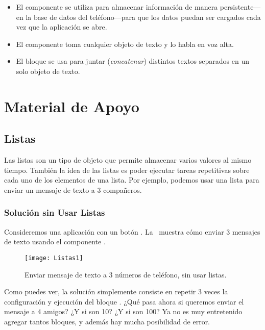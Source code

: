 {{\begin{itemize}
\item El componente  se utiliza para almacenar
  información de manera persistente---en la base de datos del
  teléfono---para que los datos puedan ser cargados cada vez que la
  aplicación se abre.

\item El componente  toma cualquier objeto de
  texto y lo habla en voz alta.

\item El bloque  se usa para juntar (\emph{concatenar})
  distintos textos separados en un solo objeto de texto.

\end{itemize}


\section{Material de Apoyo}

\subsection*{Listas}

Las listas son un tipo de objeto que permite almacenar varios valores
al mismo tiempo. También la idea de las listas es poder ejecutar
tareas repetitivas sobre cada uno de los elementos de una lista. Por
ejemplo, podemos usar una lista para enviar un mensaje de texto a 3
compañeros.

\subsubsection*{Solución sin Usar Listas}

Consideremos una aplicación con un botón
. La~ muestra cómo
enviar 3 mensajes de texto usando el componente
.

\begin{figure}[H]
\vspace{3em}
\centering
\texttt{[image: Listas1]}
\caption{Enviar mensaje de texto a 3 números de teléfono, sin usar listas.}
\label{fig:Listas1}
\end{figure}

Como puedes ver, la solución simplemente consiste en repetir 3 veces
la configuración y ejecución del bloque
. ¿Qué pasa ahora si queremos enviar
el mensaje a 4 amigos? ¿Y si son 10? ¿Y si son 100? Ya no es muy
entretenido agregar tantos bloques, y además hay mucha posibilidad de
error.

}}
